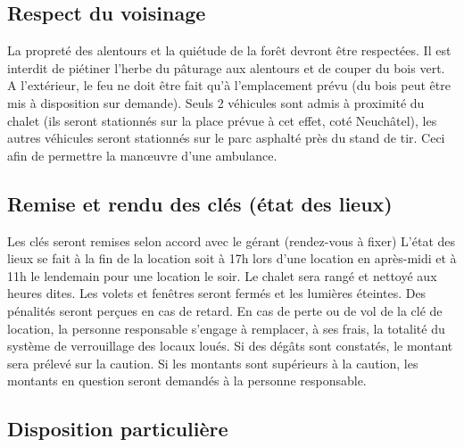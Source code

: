 \documentclass[a4paper,12pt]{extarticle}
\begin{document}
\subsection{Respect du voisinage}
La propreté des alentours et la quiétude de la forêt devront être respectées.
Il est interdit de piétiner l'herbe du pâturage aux alentours et de couper du bois vert.
A l'extérieur, le feu ne doit être fait qu'à l'emplacement prévu (du bois peut être mis à disposition sur demande).
Seuls 2 véhicules sont admis à proximité du chalet (ils seront stationnés sur la place prévue à cet effet, coté Neuchâtel), les autres véhicules seront stationnés sur le parc asphalté près du stand de tir.
Ceci afin de permettre la manœuvre d'une ambulance.

\subsection{Remise et rendu des clés (état des lieux)}
Les clés seront remises selon accord avec le gérant (rendez-vous à fixer)
{\color{red} L'état des lieux se fait à la fin de la location} soit à 17h lors d'une location en après-midi et à 11h le lendemain pour une location le soir.
Le chalet sera rangé et nettoyé aux heures dites. Les volets et fenêtres seront fermés et les lumières éteintes.
{\color{red} Des pénalités seront perçues en cas de retard.
En cas de perte ou de vol de la clé de location, la personne responsable s'engage à remplacer, à ses frais, la totalité du système de verrouillage des locaux loués.
Si des dégâts sont constatés, le montant sera prélevé sur la caution. Si les montants sont supérieurs à la caution, les montants en question seront demandés à la personne responsable.}


\subsection{Disposition particulière}
\end{document}
